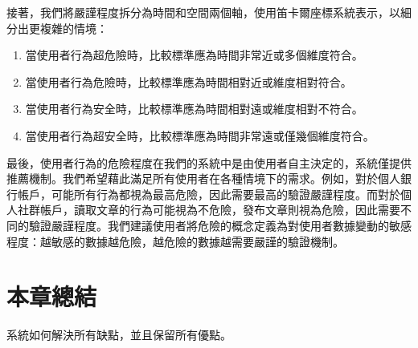 接著，我們將嚴謹程度拆分為時間和空間兩個軸，使用笛卡爾座標系統表示，以細分出更複雜的情境：
\begin{enumerate}
  \item 當使用者行為超危險時，比較標準應為時間非常近或多個維度符合。
  \item 當使用者行為危險時，比較標準應為時間相對近或維度相對符合。
  \item 當使用者行為安全時，比較標準應為時間相對遠或維度相對不符合。
  \item 當使用者行為超安全時，比較標準應為時間非常遠或僅幾個維度符合。
\end{enumerate}

最後，使用者行為的危險程度在我們的系統中是由使用者自主決定的，系統僅提供推薦機制。我們希望藉此滿足所有使用者在各種情境下的需求。例如，對於個人銀行帳戶，可能所有行為都視為最高危險，因此需要最高的驗證嚴謹程度。而對於個人社群帳戶，讀取文章的行為可能視為不危險，發布文章則視為危險，因此需要不同的驗證嚴謹程度。我們建議使用者將危險的概念定義為對使用者數據變動的敏感程度：越敏感的數據越危險，越危險的數據越需要嚴謹的驗證機制。
\section{本章總結}
系統如何解決所有缺點，並且保留所有優點。
